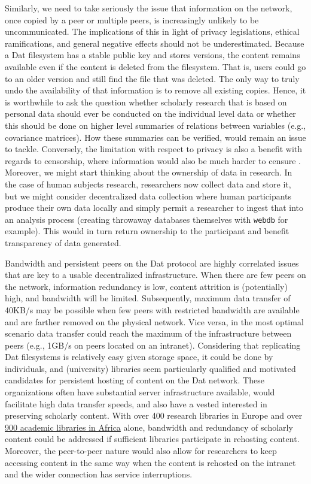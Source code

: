 \documentclass[publications,article,submit,moreauthors,pdftex,10pt,a4paper]{Definitions/mdpi}
\begin{document}
Similarly, we need to take seriously the issue that information on the
network, once copied by a peer or multiple peers, is increasingly
unlikely to be uncommunicated. The implications of this in light of
privacy legislations, ethical ramifications, and general negative
effects should not be underestimated. Because a Dat filesystem has a
stable public key and stores versions, the content remains available
even if the content is deleted from the filesystem. That is, users
could go to an older version and still find the file that was
deleted. The only way to truly undo the availability of that
information is to remove all existing copies. Hence, it is worthwhile
to ask the question whether scholarly research that is based on
personal data should ever be conducted on the individual level data or
whether this should be done on higher level summaries of relations
between variables (e.g., covariance matrices). How these summaries can
be verified, would remain an issue to tackle. Conversely, the
limitation with respect to privacy is also a benefit with regards to
censorship, where information would also be much harder to censure
\citep[in stark contrast to publishers that might be pressured by
  governments;][]{guardian-cup}. Moreover, we might start thinking
about the ownership of data in research. In the case of human subjects
research, researchers now collect data and store it, but we might
consider decentralized data collection where human participants
produce their own data locally and simply permit a researcher to
ingest that into an analysis process (creating throwaway databases
themselves with \texttt{webdb} for example). This would in turn return
ownership to the participant and benefit transparency of data
generated.

Bandwidth and persistent peers on the Dat protocol are highly
correlated issues that are key to a usable decentralized
infrastructure. When there are few peers on the network, information
redundancy is low, content attrition is (potentially) high, and
bandwidth will be limited.  Subsequently, maximum data transfer of
40KB/s may be possible when few peers with restricted bandwidth are
available and are farther removed on the physical network. Vice versa,
in the most optimal scenario data transfer could reach the maximum of
the infrastructure between peers (e.g., 1GB/s on peers located on an
intranet). Considering that replicating Dat filesystems is relatively
easy given storage space, it could be done by individuals, and
(university) libraries seem particularly qualified and motivated
candidates for persistent hosting of content on the Dat network. These
organizations often have substantial server infrastructure available,
would facilitate high data transfer speeds, and also have a vested
interested in preserving scholarly content. With over 400 research
libraries in Europe and over
\href{http://db.aflia.net/list/?q=6\&m=n}{900 academic libraries in
  Africa} alone, bandwidth and redundancy of scholarly content could
be addressed if sufficient libraries participate in rehosting content.
Moreover, the peer-to-peer nature would also allow for researchers to
keep accessing content in the same way when the content is rehosted on
the intranet and the wider connection has service interruptions.
\end{document}
